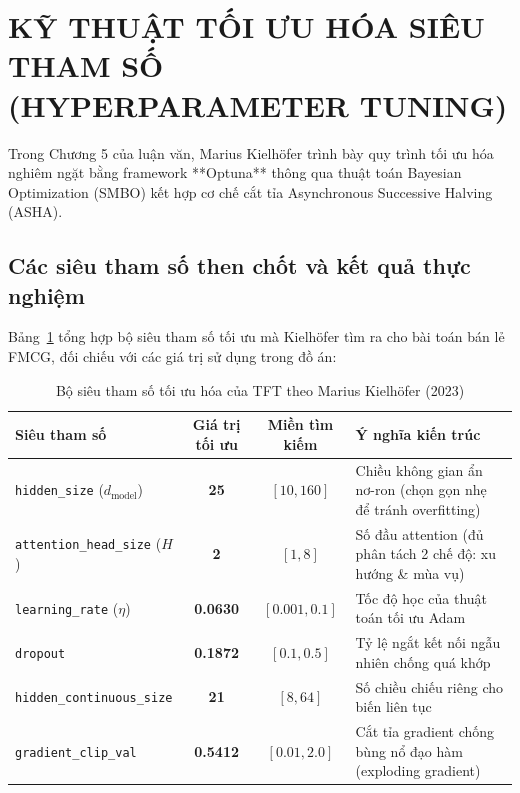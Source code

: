 \documentclass[12pt,a4paper,oneside]{article}
\begin{document}
\newpage
\section{KỸ THUẬT TỐI ƯU HÓA SIÊU THAM SỐ (HYPERPARAMETER TUNING)}
\label{sec:hyperparameter_tuning}

Trong Chương 5 của luận văn, Marius Kielh\"{o}fer trình bày quy trình tối ưu hóa nghiêm ngặt bằng framework **Optuna** thông qua thuật toán Bayesian Optimization (SMBO) kết hợp cơ chế cắt tỉa Asynchronous Successive Halving (ASHA).

\subsection{Các siêu tham số then chốt và kết quả thực nghiệm}
Bảng~\ref{tab:optuna_params} tổng hợp bộ siêu tham số tối ưu mà Kielh\"{o}fer tìm ra cho bài toán bán lẻ FMCG, đối chiếu với các giá trị sử dụng trong đồ án:

\begin{table}[htbp]
\centering
\caption{Bộ siêu tham số tối ưu hóa của TFT theo Marius Kielh\"{o}fer (2023)}
\label{tab:optuna_params}
\begin{tabular}{lccl}
\toprule
\textbf{Siêu tham số} & \textbf{Giá trị tối ưu} & \textbf{Miền tìm kiếm} & \textbf{Ý nghĩa kiến trúc} \\
\midrule
\texttt{hidden\_size} ($d_{\text{model}}$) & \textbf{25} & $[10, 160]$ & Chiều không gian ẩn nơ-ron (chọn gọn nhẹ để tránh overfitting) \\
\texttt{attention\_head\_size} ($H$) & \textbf{2} & $[1, 8]$ & Số đầu attention (đủ phân tách 2 chế độ: xu hướng \& mùa vụ) \\
\texttt{learning\_rate} ($\eta$) & \textbf{0.0630} & $[0.001, 0.1]$ & Tốc độ học của thuật toán tối ưu Adam \\
\texttt{dropout} & \textbf{0.1872} & $[0.1, 0.5]$ & Tỷ lệ ngắt kết nối ngẫu nhiên chống quá khớp \\
\texttt{hidden\_continuous\_size} & \textbf{21} & $[8, 64]$ & Số chiều chiếu riêng cho biến liên tục \\
\texttt{gradient\_clip\_val} & \textbf{0.5412} & $[0.01, 2.0]$ & Cắt tỉa gradient chống bùng nổ đạo hàm (exploding gradient) \\
\bottomrule
\end{tabular}
\end{table}
\end{document}
